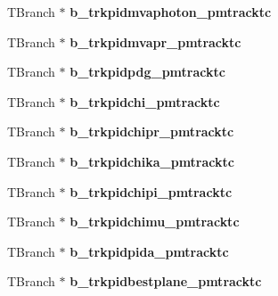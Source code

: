 \begin{DoxyCompactItemize}
\item 
\hypertarget{classanatree_a60e2be60803acd66f2c98d36c6337b0e}{T\-Branch $\ast$ {\bfseries b\-\_\-trkpidmvaphoton\-\_\-pmtracktc}}\label{classanatree_a60e2be60803acd66f2c98d36c6337b0e}

\item 
\hypertarget{classanatree_a08c13955d9f3ee78a9b0807727c51662}{T\-Branch $\ast$ {\bfseries b\-\_\-trkpidmvapr\-\_\-pmtracktc}}\label{classanatree_a08c13955d9f3ee78a9b0807727c51662}

\item 
\hypertarget{classanatree_aab4d0917fbdeb44aa67a3ed45c6d32a5}{T\-Branch $\ast$ {\bfseries b\-\_\-trkpidpdg\-\_\-pmtracktc}}\label{classanatree_aab4d0917fbdeb44aa67a3ed45c6d32a5}

\item 
\hypertarget{classanatree_a8383a335092e34cd60fab8e4975395ab}{T\-Branch $\ast$ {\bfseries b\-\_\-trkpidchi\-\_\-pmtracktc}}\label{classanatree_a8383a335092e34cd60fab8e4975395ab}

\item 
\hypertarget{classanatree_ab6633c32388a18dbdac59556ec347de5}{T\-Branch $\ast$ {\bfseries b\-\_\-trkpidchipr\-\_\-pmtracktc}}\label{classanatree_ab6633c32388a18dbdac59556ec347de5}

\item 
\hypertarget{classanatree_a18677f6b18fe8f56a7063e0d81a3868b}{T\-Branch $\ast$ {\bfseries b\-\_\-trkpidchika\-\_\-pmtracktc}}\label{classanatree_a18677f6b18fe8f56a7063e0d81a3868b}

\item 
\hypertarget{classanatree_a57b16de772a0921e339a34aa1a1edeec}{T\-Branch $\ast$ {\bfseries b\-\_\-trkpidchipi\-\_\-pmtracktc}}\label{classanatree_a57b16de772a0921e339a34aa1a1edeec}

\item 
\hypertarget{classanatree_a6d2b95af5233718b6e82fb202a7c1d6c}{T\-Branch $\ast$ {\bfseries b\-\_\-trkpidchimu\-\_\-pmtracktc}}\label{classanatree_a6d2b95af5233718b6e82fb202a7c1d6c}

\item 
\hypertarget{classanatree_add485a3f544e901cf5edb8df81e9563e}{T\-Branch $\ast$ {\bfseries b\-\_\-trkpidpida\-\_\-pmtracktc}}\label{classanatree_add485a3f544e901cf5edb8df81e9563e}

\item 
\hypertarget{classanatree_a23e630df898cfb515d8d4064377bdb36}{T\-Branch $\ast$ {\bfseries b\-\_\-trkpidbestplane\-\_\-pmtracktc}}\label{classanatree_a23e630df898cfb515d8d4064377bdb36}


\end{DoxyCompactItemize}
